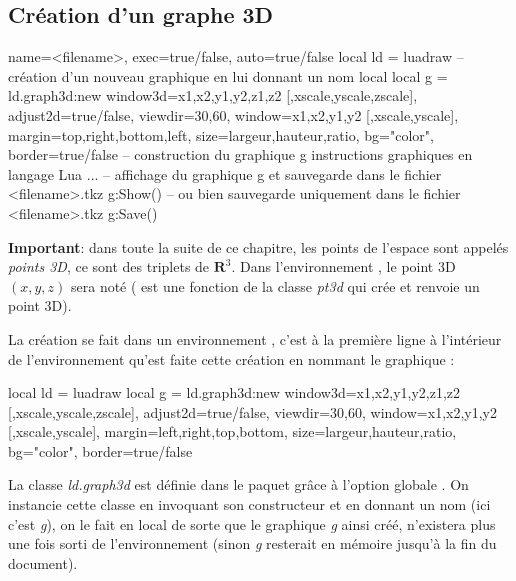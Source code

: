 \subsection{Création d'un graphe 3D}

\begin{TeXcode}
\begin{luadraw}{ name=<filename>, exec=true/false, auto=true/false }
local ld = luadraw
-- création d'un nouveau graphique en lui donnant un nom local
local g = ld.graph3d:new{ window3d={x1,x2,y1,y2,z1,z2 [,xscale,yscale,zscale]}, adjust2d=true/false, viewdir={30,60}, window={x1,x2,y1,y2 [,xscale,yscale]}, margin={top,right,bottom,left}, size={largeur,hauteur,ratio}, bg="color", border=true/false }
-- construction du graphique g
    instructions graphiques en langage Lua ...
-- affichage du graphique g et sauvegarde dans le fichier <filename>.tkz
g:Show()
-- ou bien sauvegarde uniquement dans le fichier <filename>.tkz
g:Save()
\end{luadraw}
\end{TeXcode}

\noindent\textbf{Important}: dans toute la suite de ce chapitre, les points de l'espace sont appelés \emph{points 3D}, ce sont des triplets de $\mathbf R^3$. Dans l'environnement \luadrawenv, le point 3D $(x,y,z)$ sera noté  ( est une fonction de la classe \emph{pt3d} qui crée et renvoie un point 3D).

La création se fait dans un environnement \luadrawenv, c'est à la première ligne à l'intérieur de l'environnement qu'est faite cette création en nommant le graphique :

\begin{Luacode}
local ld = luadraw
local g = ld.graph3d:new{ window3d={x1,x2,y1,y2,z1,z2 [,xscale,yscale,zscale]}, adjust2d=true/false, viewdir={30,60}, window={x1,x2,y1,y2 [,xscale,yscale]}, margin={left,right,top,bottom}, size={largeur,hauteur,ratio}, bg="color", border=true/false }
\end{Luacode}

La classe \emph{ld.graph3d} est définie dans le paquet \luadrawenv grâce à l'option globale . On instancie cette classe en invoquant son constructeur et en donnant un nom (ici c'est \emph{g}), on le fait en local de sorte que le graphique \emph{g} ainsi créé, n'existera plus une fois sorti de l'environnement (sinon \emph{g} resterait en mémoire jusqu'à la fin du document).

